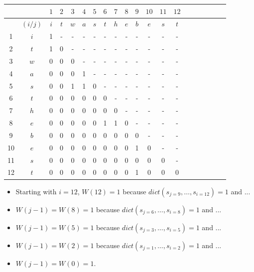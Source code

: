 \documentclass[12pt, letterpaper]{article}
\begin{document}
\begin{center}
\begin{tabular}{|c|c|c|c|c|c|c|c|c|c|c|c|c|c|c|c|c|c|c|c|}
    \hline
    & & \(1\) & \(2\) & \(3\) & \(4\) & \(5\) & \(6\) & \(7\) & \(8\) & \(9\) & \(10\) & \(11\) & \(12\) \\
    \hline
    & \((i/j)\) & \(i\) & \(t\) & \(w\) & \(a\) & \(s\) & \(t\) & \(h\) & \(e\) & \(b\) & \(e\) & \(s\) & \(t\) \\
    \hline
    1 & \(i\) & 1 & - & - & - & - & - & - & - & - & - & - & - \\
    2 & \(t\) & 1 & 0 & - & - & - & - & - & - & - & - & - & - \\
    3 & \(w\) & 0 & 0 & 0 & - & - & - & - & - & - & - & - & - \\
    4 & \(a\) & 0 & 0 & 0 & 1 & - & - & - & - & - & - & - & - \\
    5 & \(s\) & 0 & 0 & 1 & 1 & 0 & - & - & - & - & - & - & - \\
    6 & \(t\) & 0 & 0 & 0 & 0 & 0 & 0 & - & - & - & - & - & - \\
    7 & \(h\) & 0 & 0 & 0 & 0 & 0 & 0 & 0 & - & - & - & - & - \\
    8 & \(e\) & 0 & 0 & 0 & 0 & 0 & 1 & 1 & 0 & - & - & - & - \\
    9 & \(b\) & 0 & 0 & 0 & 0 & 0 & 0 & 0 & 0 & 0 & - & - & - \\
    10 & \(e\) & 0 & 0 & 0 & 0 & 0 & 0 & 0 & 0 & 1 & 0 & - & - \\
    11 & \(s\) & 0 & 0 & 0 & 0 & 0 & 0 & 0 & 0 & 0 & 0 & 0 & - \\
    12 & \(t\) & 0 & 0 & 0 & 0 & 0 & 0 & 0 & 0 & 1 & 0 & 0 & 0 \\
    \hline
\end{tabular}
\end{center}

\begin{itemize}
\item Starting with \(i = 12\), \(W(12) = 1\) because \(dict(s_{j=9},\dots,s_{i=12}) = 1\) and ... 
\item \(W(j-1) = W(8) = 1\) because \(dict(s_{j=6},\dots,s_{i=8}) = 1\) and ...
\item \(W(j-1) = W(5) = 1\) because \(dict(s_{j=3},\dots,s_{i=5}) = 1\) and ...
\item \(W(j-1) = W(2) = 1\) because \(dict(s_{j=1},\dots,s_{i=2}) = 1\) and ...
\item \(W(j-1)=W(0)=1\).
\end{itemize}
\end{document}
